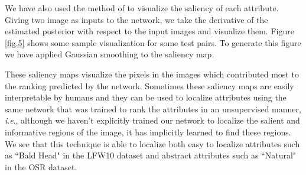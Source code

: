 \documentclass[runningheads]{llncs}
\newcommand{\ie}{\textit{i}.\textit{e}.}
\begin{document}
We have also used the method of \cite{saliency} to visualize the saliency of each attribute. Giving two image as inputs to the network, we take the derivative of the estimated posterior with respect to the input images and visualize them. Figure \ref{fig.5} shows some sample visualization for some test pairs. To generate this figure we have applied Gaussian smoothing to the saliency map.

These saliency maps visualize the pixels in the images which contributed most to the ranking predicted by the network. Sometimes these saliency maps are easily interpretable by humans and they can be used to localize attributes using the same network that was trained to rank the attributes in an unsupervised manner, \ie, although we haven't explicitly trained our network to localize the salient and informative regions of the image, it has implicitly learned to find these regions.
We see that this technique is able to localize both easy to localize attributes such as ``Bald Head" in the LFW10 dataset and abstract attributes such as ``Natural" in the OSR dataset.
\end{document}
